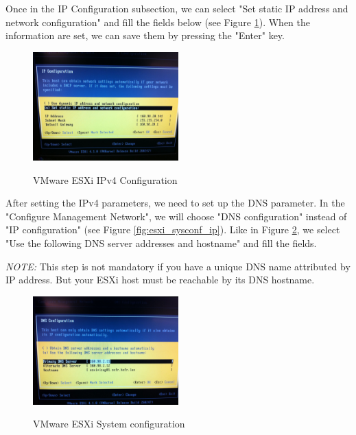 \pagebreak
Once in the IP Configuration subsection, we can select "Set static IP address and network configuration" and fill the fields below (see Figure \ref{fig:esxi_sysconf_ipv4}). When the information are set, we can save them by pressing the "Enter" key. 

\begin{figure}[ht]
	\caption{VMware ESXi IPv4 Configuration}
  	\centering
	\includegraphics[width=0.5\textwidth]{./pic/esxi_11.jpg}
	\label{fig:esxi_sysconf_ipv4}
\end{figure}


After setting the IPv4 parameters, we need to set up the DNS parameter. In the "Configure Management Network", we will choose "DNS configuration" instead of "IP configuration" (see Figure \ref{fig:esxi_sysconf_ip}). Like in Figure \ref{fig:esxi_sysconf_dns}, we select "Use the following DNS server addresses and hostname" and fill the fields. \s

\textit{NOTE:} This step is not mandatory if you have a unique DNS name attributed by IP address. But your ESXi host must be reachable by its DNS hostname. 
\begin{figure}[ht]
	\caption{VMware ESXi System configuration}
  	\centering
	\includegraphics[width=0.5\textwidth]{./pic/esxi_12.jpg}
	\label{fig:esxi_sysconf_dns}
\end{figure}

\pagebreak

